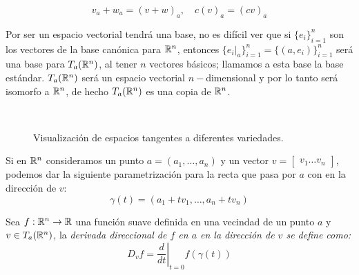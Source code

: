 \[ v_a + w_a = (v + w)_{a}, \quad c(v)_{a} = (cv)_{a} \]

Por ser un espacio vectorial tendrá una base, no es difícil ver que si $\{e_i\}_{i=1}^n$ son los vectores de la base canónica para $\mathbb{R}^n$, entonces $\{e_i|_{a}\}_{i=1}^n = \{(a,e_i)\}_{i=1}^n$ será una base para $T_a(\mathbb{R}^n)$, al tener $n$ vectores básicos; llamamos a esta base la base estándar. $T_a(\mathbb{R}^n)$ será un espacio vectorial $n-$dimensional y por lo tanto será isomorfo a $\mathbb{R}^n$, de hecho $T_a(\mathbb{R}^n)$ es una copia de $\mathbb{R}^n$.

\begin{center}
\begin{figure}[h]
	\centering
	\begin{subfigure}{0.40\textwidth}
		\centering
    
	\end{subfigure}
	\begin{subfigure}{0.40\textwidth}
		\centering
    
	\end{subfigure}
  \\[20pt]
	\begin{subfigure}{0.40\textwidth}
		\centering
    
	\end{subfigure}
	\begin{subfigure}{0.40\textwidth}
		\centering
    
	\end{subfigure}
\caption{Visualización de espacios tangentes a diferentes variedades.}
\end{figure}
\end{center}

Si en $\mathbb{R}^n$ consideramos un punto $a = (a_1, \dots, a_n)$ y un vector $v = \begin{bmatrix} v_1 \dots v_n \end{bmatrix}$, podemos dar la siguiente parametrización para la recta que pasa por $a$ con en la dirección de $v$:
\[ \gamma(t) = (a_1 + tv_1, \dots, a_n + tv_n) \]





\begin{definition}\label{Definción: Derivada Direccional}
	Sea $f: \mathbb{R}^n \to \mathbb{R}$ una función suave definida en una vecindad de un punto $a$ y $v \in T_a(\mathbb{R}^n)$, la \it{derivada direccional} de $f$ en $a$ en la dirección de $v$ se define como:
	\[ D_v f = \left. \frac{d}{dt} \right|_{t=0} f(\gamma(t)) \]
\end{definition}

